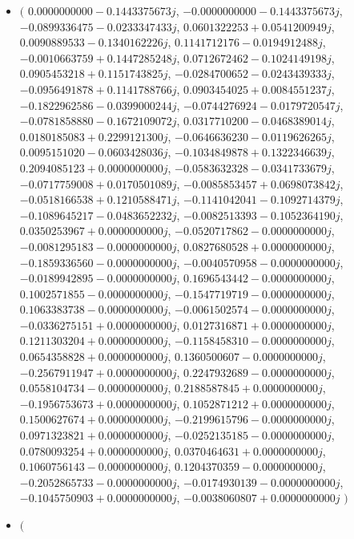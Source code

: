 \documentclass[14pt,a4paper]{article}
\begin{document}
\begin{itemize}
\item
$\big($
$0.0000000000-0.1443375673j$, $-0.0000000000-0.1443375673j$, $-0.0899336475-0.0233347433j$, $0.0601322253+0.0541200949j$, $0.0090889533-0.1340162226j$, $0.1141712176-0.0194912488j$, $-0.0010663759+0.1447285248j$, $0.0712672462-0.1024149198j$, $0.0905453218+0.1151743825j$, $-0.0284700652-0.0243439333j$, $-0.0956491878+0.1141788766j$, $0.0903454025+0.0084551237j$, $-0.1822962586-0.0399000244j$, $-0.0744276924-0.0179720547j$, $-0.0781858880-0.1672109072j$, $0.0317710200-0.0468389014j$, $0.0180185083+0.2299121300j$, $-0.0646636230-0.0119626265j$, $0.0095151020-0.0603428036j$, $-0.1034849878+0.1322346639j$, $0.2094085123+0.0000000000j$, $-0.0583632328-0.0341733679j$, $-0.0717759008+0.0170501089j$, $-0.0085853457+0.0698073842j$, $-0.0518166538+0.1210588471j$, $-0.1141042041-0.1092714379j$, $-0.1089645217-0.0483652232j$, $-0.0082513393-0.1052364190j$, $0.0350253967+0.0000000000j$, $-0.0520717862-0.0000000000j$, $-0.0081295183-0.0000000000j$, $0.0827680528+0.0000000000j$, $-0.1859336560-0.0000000000j$, $-0.0040570958-0.0000000000j$, $-0.0189942895-0.0000000000j$, $0.1696543442-0.0000000000j$, $0.1002571855-0.0000000000j$, $-0.1547719719-0.0000000000j$, $0.1063383738-0.0000000000j$, $-0.0061502574-0.0000000000j$, $-0.0336275151+0.0000000000j$, $0.0127316871+0.0000000000j$, $0.1211303204+0.0000000000j$, $-0.1158458310-0.0000000000j$, $0.0654358828+0.0000000000j$, $0.1360500607-0.0000000000j$, $-0.2567911947+0.0000000000j$, $0.2247932689-0.0000000000j$, $0.0558104734-0.0000000000j$, $0.2188587845+0.0000000000j$, $-0.1956753673+0.0000000000j$, $0.1052871212+0.0000000000j$, $0.1500627674+0.0000000000j$, $-0.2199615796-0.0000000000j$, $0.0971323821+0.0000000000j$, $-0.0252135185-0.0000000000j$, $0.0780093254+0.0000000000j$, $0.0370464631+0.0000000000j$, $0.1060756143-0.0000000000j$, $0.1204370359-0.0000000000j$, $-0.2052865733-0.0000000000j$, $-0.0174930139-0.0000000000j$, $-0.1045750903+0.0000000000j$, $-0.0038060807+0.0000000000j$
$\big)$
\item
$\big($

\end{itemize}
\end{document}
